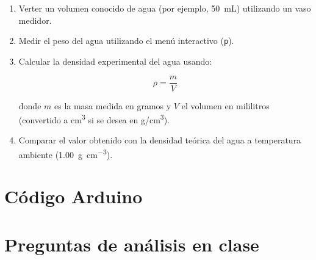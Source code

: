 \begin{enumerate}
\begin{enumerate}
    \item Verter un volumen conocido de agua (por ejemplo, \SI{50}{\milli\liter}) utilizando un vaso medidor.
  
    \item Medir el peso del agua utilizando el menú interactivo (\texttt{p}).
  
    \item Calcular la densidad experimental del agua usando:
  
  \[
  \rho = \frac{m}{V}
  \]

  donde $m$ es la masa medida en gramos y $V$ el volumen en mililitros (convertido a cm\textsuperscript{3} si se desea en g/cm\textsuperscript{3}).
  
    \item Comparar el valor obtenido con la densidad teórica del agua a temperatura ambiente (\SI{1.00}{\gram\per\centi\meter\cubed}).

  \end{enumerate}

  \end{enumerate}




\section*{Código Arduino}
 



\section*{Preguntas de análisis en clase}

